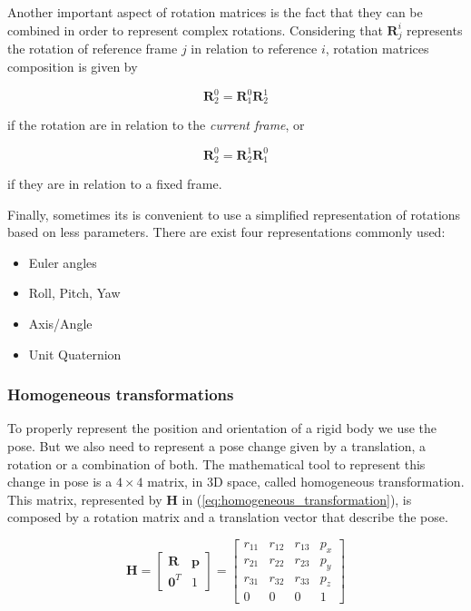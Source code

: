 Another important aspect of rotation matrices is the fact that they can be combined in order to represent complex rotations. Considering that $\boldsymbol{R}^{i}_{j}$ represents the rotation of reference frame $j$ in relation to reference $i$, rotation matrices composition is given by

\begin{equation}
    \boldsymbol{R}^{0}_{2} = \boldsymbol{R}^{0}_{1}\boldsymbol{R}^{1}_{2}
\end{equation}

if the rotation are in relation to the \emph{current frame}, or

\begin{equation}
    \boldsymbol{R}^{0}_{2} = \boldsymbol{R}^{1}_{2}\boldsymbol{R}^{0}_{1}
\end{equation}

if they are in relation to a fixed frame.

Finally, sometimes its is convenient to use a simplified representation of rotations based on less parameters. There are exist four representations commonly used:

\begin{itemize}
    \item Euler angles
    \item Roll, Pitch, Yaw
    \item Axis/Angle
    \item Unit Quaternion
\end{itemize}


\subsubsection{Homogeneous transformations}
\label{subsubsec:homogeneous_transformations}

To properly represent the position and orientation of a rigid body we use the pose. But we also need to represent a pose change given by a translation, a rotation or a combination of both. The mathematical tool to represent this change in pose is a $4\times4$ matrix, in 3D space, called homogeneous transformation. This matrix, represented by $\boldsymbol{H}$ in (\ref{eq:homogeneous_transformation}), is composed by a rotation matrix and a translation vector that describe the pose.

\begin{equation}
    \label{eq:homogeneous_transformation}
    \boldsymbol{H} = \begin{bmatrix} \boldsymbol{R} & \boldsymbol{p} \\ 
    \boldsymbol{0}^{T} & 1\end{bmatrix} = \begin{bmatrix} r_{11} & r_{12} & r_{13} & p_x\\
    r_{21} & r_{22} & r_{23} & p_y\\
    r_{31} & r_{32} & r_{33} & p_z\\
    0 & 0 & 0 & 1\end{bmatrix}
\end{equation}

